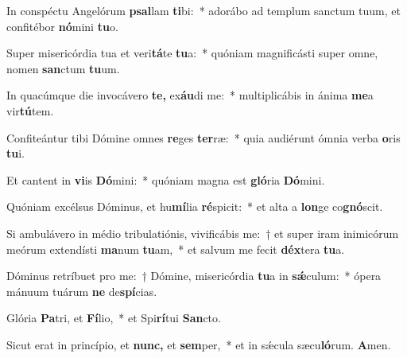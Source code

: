 \item In conspéctu Angelórum \textbf{psal}lam \textbf{ti}bi:~* adorábo ad templum sanctum tuum, et confitébor \textbf{nó}mini \textbf{tu}o.
\item Super misericórdia tua et veri\textbf{tá}te \textbf{tu}a:~* quóniam magnificásti super omne, nomen \textbf{san}ctum \textbf{tu}um.
\item In quacúmque die invocávero \textbf{te,} ex\textbf{áu}di me:~* multiplicábis in ánima \textbf{me}a vir\textbf{tú}tem.
\item Confiteántur tibi Dómine omnes \textbf{re}ges \textbf{ter}ræ:~* quia audiérunt ómnia verba \textbf{o}ris \textbf{tu}i.
\item Et cantent in \textbf{vi}is \textbf{Dó}mini:~* quóniam magna est \textbf{gló}ria \textbf{Dó}mini.
\item Quóniam excélsus Dóminus, et hu\textbf{mí}lia \textbf{ré}spicit:~* et alta a \textbf{lon}ge co\textbf{gnó}scit.
\item Si ambulávero in médio tribulatiónis, vivificábis me:~† et super iram inimicórum meórum extendísti \textbf{ma}num \textbf{tu}am,~* et salvum me fecit \textbf{déx}tera \textbf{tu}a.
\item Dóminus retríbuet pro me:~† Dómine, misericórdia \textbf{tu}a in \textbf{sǽ}culum:~* ópera mánuum tuárum \textbf{ne} de\textbf{spí}cias.
\item Glória \textbf{Pa}tri, et \textbf{Fí}lio,~* et Spi\textbf{rí}tui \textbf{San}cto.
\item Sicut erat in princípio, et \textbf{nunc,} et \textbf{sem}per,~* et in sǽcula sæcu\textbf{ló}rum. \textbf{A}men.